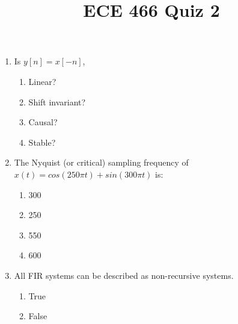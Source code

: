 \documentclass{article}
\begin{document}
 
\title{ECE 466 Quiz 2}
 
\maketitle
 
\begin{enumerate}
    \item Is $y[n]=x[-n]$,
    \begin{enumerate}
        \item Linear?
        \item Shift invariant?
        \item Causal?
        \item Stable?
    \end{enumerate}

    \item The Nyquist (or critical) sampling frequency of $x(t) = cos(250\pi t) + sin(300\pi t)$ is:
    \begin{enumerate}
        \item 300
        \item 250
        \item 550
        \item 600
    \end{enumerate}

    \item All FIR systems can be described as non-recursive systems.
    \begin{enumerate}
        \item True
        \item False
    \end{enumerate}
\end{enumerate}
\end{document}
